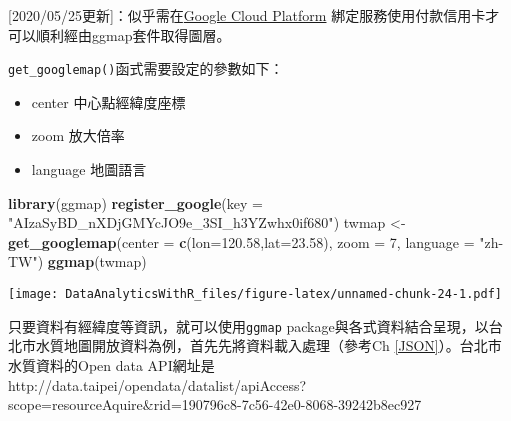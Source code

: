 \documentclass[
]{book}
\newenvironment{Shaded}{\begin{snugshade}}{\end{snugshade}}
\newcommand{\DataTypeTok}[1]{\textcolor[rgb]{0.13,0.29,0.53}{#1}}
\newcommand{\DecValTok}[1]{\textcolor[rgb]{0.00,0.00,0.81}{#1}}
\newcommand{\FloatTok}[1]{\textcolor[rgb]{0.00,0.00,0.81}{#1}}
\newcommand{\KeywordTok}[1]{\textcolor[rgb]{0.13,0.29,0.53}{\textbf{#1}}}
\newcommand{\NormalTok}[1]{#1}
\newcommand{\StringTok}[1]{\textcolor[rgb]{0.31,0.60,0.02}{#1}}
\providecommand{\tightlist}{%
  \setlength{\itemsep}{0pt}\setlength{\parskip}{0pt}}
\begin{document}
{[}2020/05/25更新{]}：似乎需在\href{https://console.cloud.google.com/}{Google Cloud Platform} 綁定服務使用付款信用卡才可以順利經由ggmap套件取得圖層。

\texttt{get\_googlemap()}函式需要設定的參數如下：

\begin{itemize}
\tightlist
\item
  center 中心點經緯度座標
\item
  zoom 放大倍率
\item
  language 地圖語言
\end{itemize}

\begin{Shaded}
\begin{Highlighting}[]
\KeywordTok{library}\NormalTok{(ggmap)}
\KeywordTok{register_google}\NormalTok{(}\DataTypeTok{key =} \StringTok{"AIzaSyBD_nXDjGMYcJO9e_3SI_h3YZwhx0if680"}\NormalTok{)}
\NormalTok{twmap <-}\StringTok{ }\KeywordTok{get_googlemap}\NormalTok{(}\DataTypeTok{center =} \KeywordTok{c}\NormalTok{(}\DataTypeTok{lon=}\FloatTok{120.58}\NormalTok{,}\DataTypeTok{lat=}\FloatTok{23.58}\NormalTok{), }
                  \DataTypeTok{zoom =} \DecValTok{7}\NormalTok{,}
                  \DataTypeTok{language =} \StringTok{"zh-TW"}\NormalTok{)}
\KeywordTok{ggmap}\NormalTok{(twmap)}
\end{Highlighting}
\end{Shaded}

\texttt{[image: DataAnalyticsWithR\_files/figure-latex/unnamed-chunk-24-1.pdf]}

只要資料有經緯度等資訊，就可以使用\texttt{ggmap} package與各式資料結合呈現，以台北市水質地圖開放資料為例，首先先將資料載入處理（參考Ch \ref{JSON}）。台北市水質資料的Open data API網址是http://data.taipei/opendata/datalist/apiAccess?scope=resourceAquire\&rid=190796c8-7c56-42e0-8068-39242b8ec927
\end{document}

